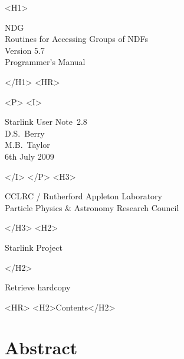\documentclass[twoside,11pt]{article}
\newcommand{\stardoccategory}  {Starlink User Note}
\newcommand{\stardocsource}    {sun\stardocnumber}
\newcommand{\stardocnumber}    {2.8}
\newcommand{\stardocauthors}   {D.S.\ Berry \\ M.B.\ Taylor}
\newcommand{\stardocdate}      {6th July 2009}
\newcommand{\stardoctitle}     {NDG \\ [\latex{1ex}]
                                Routines for Accessing Groups of NDFs}
\newcommand{\stardocversion}   {Version 5.7}
\newcommand{\stardocmanual}    {Programmer's Manual}
\newcommand{\htmladdnormallink}[2]{#1}
\newcommand{\htmladdimg}[1]{}
\newcommand{\htmlref}[2]{#1}
\newcommand{\htmladdtonavigation}[1]{}
\newcommand{\latex}[1]{#1}
\newcommand{\xlabel}[1]{}
\renewcommand{\_}{\texttt{\symbol{95}}}
\begin{document}
\begin{htmlonly}
   \xlabel{}
   \begin{rawhtml} <H1> \end{rawhtml}
      \stardoctitle\\
      \stardocversion\\
      \stardocmanual
   \begin{rawhtml} </H1> <HR> \end{rawhtml}


   \begin{rawhtml} <P> <I> \end{rawhtml}
   \stardoccategory\ \stardocnumber \\
   \stardocauthors \\
   \stardocdate
   \begin{rawhtml} </I> </P> <H3> \end{rawhtml}
      \htmladdnormallink{CCLRC / Rutherford Appleton Laboratory}
                        {http://www.cclrc.ac.uk} \\
      \htmladdnormallink{Particle Physics \& Astronomy Research Council}
                        {http://www.pparc.ac.uk} \\
   \begin{rawhtml} </H3> <H2> \end{rawhtml}
      \htmladdnormallink{Starlink Project}{http://www.starlink.rl.ac.uk/}
   \begin{rawhtml} </H2> \end{rawhtml}
   \htmladdnormallink{\htmladdimg{source.gif} Retrieve hardcopy}
      {http://www.starlink.rl.ac.uk/cgi-bin/hcserver?\stardocsource}\\

  \label{stardoccontents}
  \begin{rawhtml} 
    <HR>
    <H2>Contents</H2>
  \end{rawhtml}
  \htmladdtonavigation{\htmlref{\htmladdimg{contents_motif.gif}}
        {stardoccontents}}

  \section{\xlabel{abstract}Abstract}
\end{htmlonly}
\end{document}
